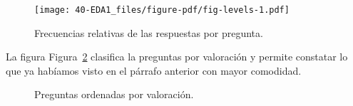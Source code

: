 \documentclass[
  12pt,
  a4paper,
  extrafontsizes,
  onecolumn,
  openright]{memoir}
\begin{document}
\begin{figure}[h]

{\centering \texttt{[image: 40-EDA1\_files/figure-pdf/fig-levels-1.pdf]}

}

\caption{\label{fig-levels}Frecuencias relativas de las respuestas por
pregunta.}

\end{figure}

La figura Figura~\ref{fig-likert} clasifica la preguntas por valoración
y permite constatar lo que ya habíamos visto en el párrafo anterior con
mayor comodidad.

\begin{figure}

\begin{minipage}[t]{0.50\linewidth}

{\centering 


}

\end{minipage}%
%
\begin{minipage}[t]{0.50\linewidth}

{\centering 


}

\end{minipage}%
\newline
\begin{minipage}[t]{0.50\linewidth}

{\centering 


}

\end{minipage}%
%
\begin{minipage}[t]{0.50\linewidth}

{\centering 


}

\end{minipage}%

\caption{\label{fig-likert}Preguntas ordenadas por valoración.}

\end{figure}
\end{document}
